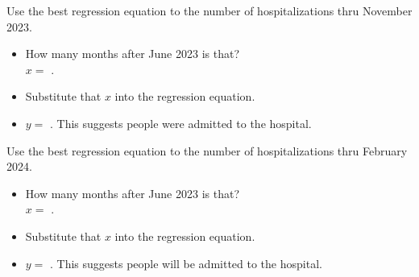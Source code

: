 \begin{minipage}{0.45\textwidth}
    \noindent 
    Use the best regression equation to  
    the number of hospitalizations  thru November 2023.
    \begin{itemize}[fullwidth,]
        \item How many months after June 2023 is that?\\ $x =$ .
        \item Substitute that $x$ into the regression equation.
        \item $y =$ . 
        This suggests  people were admitted to the hospital.
    \end{itemize}
\end{minipage}
\hfill
\begin{minipage}{0.45\textwidth}
    \noindent 
    Use the best regression equation to  
    the number of hospitalizations  thru February 2024.
    \begin{itemize}[fullwidth,]
        \item How many months after June 2023 is that?\\ $x =$ .
        \item Substitute that $x$ into the regression equation.
        \item $y =$ . 
        This suggests  people will be admitted to the hospital.
    \end{itemize}
\end{minipage}
